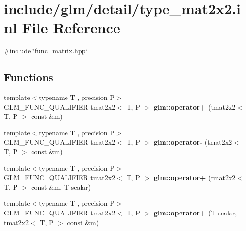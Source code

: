 \hypertarget{type__mat2x2_8inl}{}\section{include/glm/detail/type\+\_\+mat2x2.inl File Reference}
\label{type__mat2x2_8inl}
{\ttfamily \#include \char`\"{}func\+\_\+matrix.\+hpp\char`\"{}}\newline
\subsection*{Functions}
\begin{DoxyCompactItemize}
\item 
\mbox{\label{type__mat2x2_8inl_aff6e5187326e145111072dd76297dc30}} 
{\footnotesize template$<$typename T , precision P$>$ }\\G\+L\+M\+\_\+\+F\+U\+N\+C\+\_\+\+Q\+U\+A\+L\+I\+F\+I\+ER tmat2x2$<$ T, P $>$ {\bfseries glm\+::operator+} (tmat2x2$<$ T, P $>$ const \&m)
\item 
\mbox{\label{type__mat2x2_8inl_a5c577105c34c751e1be42b9406ef239d}} 
{\footnotesize template$<$typename T , precision P$>$ }\\G\+L\+M\+\_\+\+F\+U\+N\+C\+\_\+\+Q\+U\+A\+L\+I\+F\+I\+ER tmat2x2$<$ T, P $>$ {\bfseries glm\+::operator-\/} (tmat2x2$<$ T, P $>$ const \&m)
\item 
\mbox{\label{type__mat2x2_8inl_ad505ae6e4d6d81119247881b8394e7f4}} 
{\footnotesize template$<$typename T , precision P$>$ }\\G\+L\+M\+\_\+\+F\+U\+N\+C\+\_\+\+Q\+U\+A\+L\+I\+F\+I\+ER tmat2x2$<$ T, P $>$ {\bfseries glm\+::operator+} (tmat2x2$<$ T, P $>$ const \&m, T scalar)
\item 
\mbox{\label{type__mat2x2_8inl_ac65f529361d94abe52c72cb2c193a0f4}} 
{\footnotesize template$<$typename T , precision P$>$ }\\G\+L\+M\+\_\+\+F\+U\+N\+C\+\_\+\+Q\+U\+A\+L\+I\+F\+I\+ER tmat2x2$<$ T, P $>$ {\bfseries glm\+::operator+} (T scalar, tmat2x2$<$ T, P $>$ const \&m)
\item 
\mbox{\label{type__mat2x2_8inl_aaba2f45dbfefdf70d0434dc7e1f5e664}} 

\end{DoxyCompactItemize}
